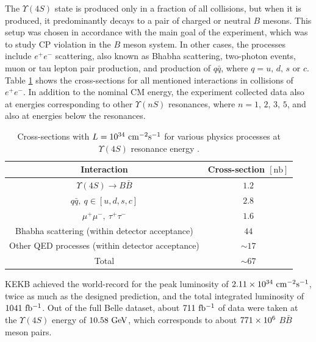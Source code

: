 The $\Upsilon(4S)$ state is produced only in a fraction of all collisions, but when it is produced, it predominantly decays to a pair of charged or neutral $B$ mesons. This setup was chosen in accordance with the main goal of the experiment, which was to study CP
violation in the $B$ meson system. In other cases, the processes include $e^+e^-$ scattering, also known as Bhabha scattering, two-photon events, muon or tau lepton pair production, and production of $q \bar q$, where $q=u,\,d,\,s$ or $c$. Table \ref{tab:xsec} shows the cross-sections for all mentioned interactions in collisions of $e^+e^-$.
In addition to the nominal CM energy, the experiment collected data also at energies
corresponding to other $\Upsilon(nS)$ resonances, where $n = 1,\,2,\,3,\,5$, and also at energies below the resonances.

\begin{table}[H]
	\centering
	\begin{tabular}{|c|c|}
		\hline
		Interaction & Cross-section $[\mathrm{nb}]$ \\ 
		\hline
		$\Upsilon(4S) \to B \bar B$ & $1.2$ \\
		$q \bar q,~q \in [u,d,s,c]$ & $2.8$ \\
		$\mu^+\mu^-,~\tau^+\tau^-$ & $1.6$ \\
		Bhabha scattering (within detector acceptance)& $44$ \\
		Other QED processes (within detector acceptance)& $\sim 17$ \\
		\hline
		Total & $\sim 67$ \\
		\hline
	\end{tabular}
	\caption{Cross-sections with $L=10^{34}\mathrm{~cm^{-2}s^{-1}}$ for various physics processes at $\Upsilon(4S)$ resonance energy \cite{ABASHIAN2002117}.}
	\label{tab:xsec}
\end{table}

KEKB achieved the world-record for the peak luminosity of $2.11\times 10^{34}\mathrm{~cm^{-2}s^{-1}}$, twice as much as the designed prediction, and the total integrated luminosity of $1041\mathrm{~fb^{-1}}$. Out of the full Belle dataset, about $711\mathrm{~fb^{-1}}$ of data were taken at the $\Upsilon(4S)$ energy of $10.58\mathrm{~GeV}$, which corresponds to about $771\times 10^{6}$ $B \bar B$ meson pairs.

